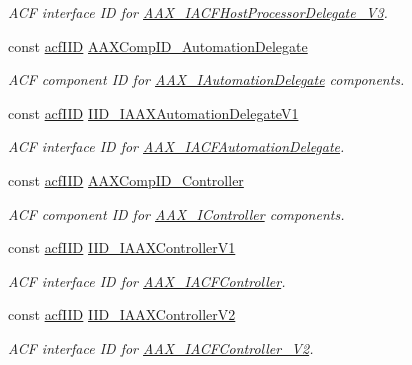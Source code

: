 \begin{Indent}
\begin{DoxyCompactItemize}
\begin{DoxyCompactList}\small\item\em A\+CF interface ID for \mbox{\hyperlink{a01709}{A\+A\+X\+\_\+\+I\+A\+C\+F\+Host\+Processor\+Delegate\+\_\+\+V3}}. \end{DoxyCompactList}\item 
const \mbox{\hyperlink{a00269_a59df0b41744eee7a066787aaedf97f67}{acf\+I\+ID}} \mbox{\hyperlink{a00683_aa22fc51d81b9a4f8fab4f819ca3f85d9}{A\+A\+X\+Comp\+I\+D\+\_\+\+Automation\+Delegate}}
\begin{DoxyCompactList}\small\item\em A\+CF component ID for \mbox{\hyperlink{a01773}{A\+A\+X\+\_\+\+I\+Automation\+Delegate}} components. \end{DoxyCompactList}\item 
const \mbox{\hyperlink{a00269_a59df0b41744eee7a066787aaedf97f67}{acf\+I\+ID}} \mbox{\hyperlink{a00683_ae771259726eee32ff16e1399e03e4457}{I\+I\+D\+\_\+\+I\+A\+A\+X\+Automation\+Delegate\+V1}}
\begin{DoxyCompactList}\small\item\em A\+CF interface ID for \mbox{\hyperlink{a01617}{A\+A\+X\+\_\+\+I\+A\+C\+F\+Automation\+Delegate}}. \end{DoxyCompactList}\item 
const \mbox{\hyperlink{a00269_a59df0b41744eee7a066787aaedf97f67}{acf\+I\+ID}} \mbox{\hyperlink{a00683_a5c927ea96aceac064ced592799c4070c}{A\+A\+X\+Comp\+I\+D\+\_\+\+Controller}}
\begin{DoxyCompactList}\small\item\em A\+CF component ID for \mbox{\hyperlink{a01789}{A\+A\+X\+\_\+\+I\+Controller}} components. \end{DoxyCompactList}\item 
const \mbox{\hyperlink{a00269_a59df0b41744eee7a066787aaedf97f67}{acf\+I\+ID}} \mbox{\hyperlink{a00683_ade31528710cfa399a89bf6bae7854fa0}{I\+I\+D\+\_\+\+I\+A\+A\+X\+Controller\+V1}}
\begin{DoxyCompactList}\small\item\em A\+CF interface ID for \mbox{\hyperlink{a01637}{A\+A\+X\+\_\+\+I\+A\+C\+F\+Controller}}. \end{DoxyCompactList}\item 
const \mbox{\hyperlink{a00269_a59df0b41744eee7a066787aaedf97f67}{acf\+I\+ID}} \mbox{\hyperlink{a00683_abf2eeeaec58a9de670e36a80507320f7}{I\+I\+D\+\_\+\+I\+A\+A\+X\+Controller\+V2}}
\begin{DoxyCompactList}\small\item\em A\+CF interface ID for \mbox{\hyperlink{a01641}{A\+A\+X\+\_\+\+I\+A\+C\+F\+Controller\+\_\+\+V2}}. \end{DoxyCompactList}\item 

\end{DoxyCompactItemize}
\end{Indent}
